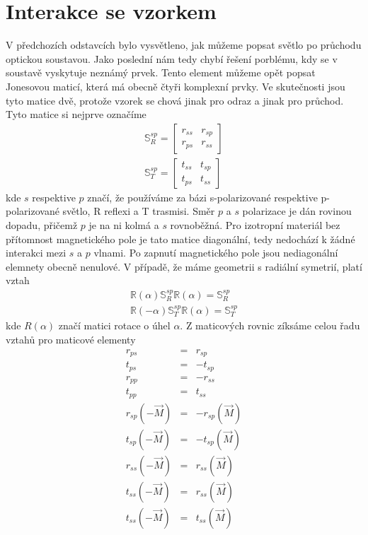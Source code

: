 \section{Interakce se vzorkem}
V předchozích odstavcích bylo vysvětleno, jak můžeme popsat světlo po průchodu optickou soustavou. Jako poslední nám tedy chybí řešení porblému, kdy se v soustavě vyskytuje neznámý prvek. Tento element můžeme opět popsat Jonesovou maticí, která má obecně čtyři komplexní prvky. Ve skutečnosti jsou tyto matice dvě, protože vzorek se chová jinak pro odraz a jinak pro průchod. Tyto matice si nejprve označíme
\begin{eqnarray}
\mathbb{S}^{sp}_R = \begin{bmatrix} r_{ss} & r_{sp} \\ r_{ps} & r_{ss} \end{bmatrix} \\
\mathbb{S}^{sp}_T = \begin{bmatrix} t_{ss} & t_{sp} \\ t_{ps} & t_{ss} \end{bmatrix} 
\end{eqnarray}
kde $s$ respektive $p$ značí, že používáme za bázi s-polarizované respektive p-polarizované světlo, 
R  reflexi a T trasmisi. Směr $p$ a $s$ polarizace je dán rovinou dopadu, přičemž $p$ je na ni kolmá a $s$ rovnoběžná. 
Pro izotropní materiál bez přítomnost magnetického pole je tato matice diagonální, tedy nedochází k žádné interakci mezi $s$ a $p$ vlnami. 
Po zapnutí magnetického pole jsou nediagonální elemnety obecně nenulové. V případě, že máme geometrii s radiální symetrií, platí vztah
\begin{eqnarray}
\mathbb{R}(\alpha)\mathbb{S}^{sp}_R\mathbb{R}(\alpha)=\mathbb{S}^{sp}_R \\
\mathbb{R}(-\alpha)\mathbb{S}^{sp}_T\mathbb{R}(\alpha)=\mathbb{S}^{sp}_T
\end{eqnarray}
kde $R(\alpha)$ značí matici rotace o úhel $\alpha$.
Z maticových rovnic zíksáme celou řadu vztahů pro maticové elementy
\begin{eqnarray}
r_{ps}&=&r_{sp} \\
t_{ps}&=&-t_{sp} \\
r_{pp}&=&-r_{ss} \\
t_{pp}&=&t_{ss} \\
r_{sp}(-\vec{M})&=&-r_{sp}(\vec{M}) \\
t_{sp}(-\vec{M})&=&-t_{sp}(\vec{M}) \\
r_{ss}(-\vec{M})&=&r_{ss}(\vec{M}) \\
t_{ss}(-\vec{M})&=&r_{ss}(\vec{M}) \\
t_{ss}(-\vec{M})&=&t_{ss}(\vec{M})
\end{eqnarray}
